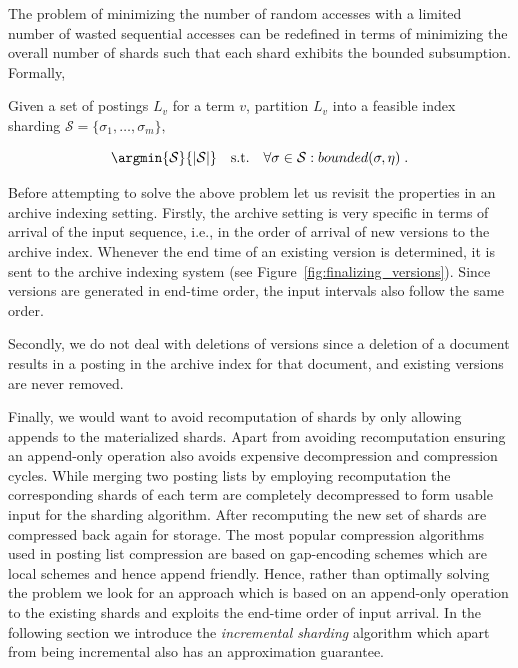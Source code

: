 The problem of minimizing the number of random accesses with a limited number of wasted sequential accesses can be redefined in terms of minimizing the overall number of shards such that each shard exhibits the bounded subsumption. Formally,

\begin{definition} 
Given a set of postings $L_v$ for a term $v$, partition $L_v$ into a feasible index sharding $\mathcal{S} = \{\sigma_1, \ldots, \sigma_{m}\},$ 


$$
  \argmin{\mathcal{S}}{|\mathcal{S}|}  \quad\mbox{s.t.} \quad \forall \sigma \in \mathcal{S} : bounded(\sigma, \eta) \;.
$$

\end{definition}

Before attempting to solve the above problem let us revisit the properties in an archive indexing setting. Firstly, the archive setting is very specific in terms of arrival of the input sequence, i.e., in the order of arrival of new versions to the archive index. Whenever the end time of an existing version is determined, it is sent to the archive indexing system (see Figure~\ref{fig:finalizing_versions}). Since versions are generated in end-time order, the input intervals also follow the same order. 

Secondly, we do not deal with deletions of versions since a deletion of a document results in a posting in the archive index for that document, and existing versions are never removed. 

Finally, we would want to avoid recomputation of shards by only allowing appends to the materialized shards. Apart from avoiding recomputation ensuring an append-only operation also avoids expensive decompression and compression cycles. While merging two posting lists by employing recomputation the corresponding shards of each term are completely decompressed to form usable input for the sharding algorithm. After recomputing the new set of shards are compressed back again for storage. The most popular compression algorithms used in posting list compression are based on gap-encoding schemes which are local schemes and hence append friendly. Hence, rather than optimally solving the problem we look for an approach which is based on an append-only operation to the existing shards and exploits the end-time order of input arrival. In the following section we introduce the \emph{incremental sharding} algorithm which apart from being incremental also has an approximation guarantee. 

